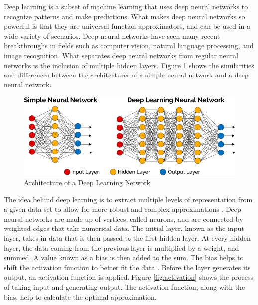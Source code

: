 \documentclass[12pt]{article}
\begin{document}
Deep learning is a subset of machine learning that uses deep neural networks to recognize patterns and make predictions.  What makes deep neural networks so powerful is that they are universal function approximators, and can be used in a wide variety of scenarios. Deep neural networks have seen many recent breakthroughs in fields such as computer vision, natural language processing, and image recognition.  What separates deep neural networks from regular neural networks is the inclusion of multiple hidden layers. Figure \ref{fig:deep_learning} shows the similarities and differences between the architectures of a simple neural network and a deep neural network.


\begin{figure} [ht!]
    \centering
    \includegraphics[width=1\textwidth, height=0.2\textheight]{deepLearning.png}
    \caption{Architecture of a Deep Learning Network \cite{iesc_2018}}
    \label{fig:deep_learning}
\end{figure}

The idea behind deep learning is to extract multiple levels of representation from a given data set to allow for more robust and complex approximations \cite{lecun_2015}. Deep neural networks are made up of vertices, called neurons, and are connected by weighted edges that take numerical data.  The initial layer, known as the input layer, takes in data that is then passed to the first hidden layer.  At every hidden layer, the data coming from the previous layer is multiplied by a weight, and summed.  A value known as a bias is then added to the sum. The bias helps to shift the activation function to better fit the data \cite{collis_collis_2017}. Before the layer generates its output, an activation function is applied.  Figure \ref{fig:activation} shows the process of taking input and generating output. The activation function, along with the bias, help to calculate the optimal approximation.  
\end{document}
